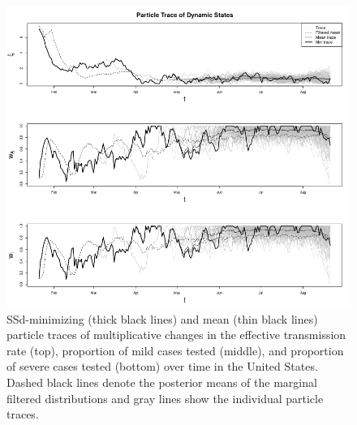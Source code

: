 \documentclass{article}
\begin{document}
\begin{figure}
\centering
\includegraphics[width=1.0\textwidth]{figures/covid_pf_trace_US_500000-dynamicStates-2020-08-26}
\caption{SSd-minimizing (thick black lines) and mean (thin black lines) particle traces of multiplicative changes in the effective transmission rate (top), proportion of mild cases tested (middle), and proportion of severe cases tested (bottom) over time in the United States. Dashed black lines denote the posterior means of the marginal filtered distributions and gray lines show the individual particle traces.} \label{fig:dyntraceUS}
\end{figure}
\end{document}
